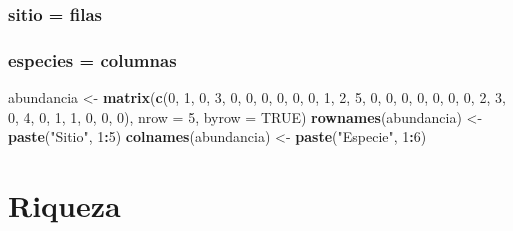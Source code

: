 \documentclass[
]{article}
\newenvironment{Shaded}{\begin{snugshade}}{\end{snugshade}}
\newcommand{\AttributeTok}[1]{\textcolor[rgb]{0.13,0.29,0.53}{#1}}
\newcommand{\ConstantTok}[1]{\textcolor[rgb]{0.56,0.35,0.01}{#1}}
\newcommand{\DecValTok}[1]{\textcolor[rgb]{0.00,0.00,0.81}{#1}}
\newcommand{\FunctionTok}[1]{\textcolor[rgb]{0.13,0.29,0.53}{\textbf{#1}}}
\newcommand{\NormalTok}[1]{#1}
\newcommand{\OtherTok}[1]{\textcolor[rgb]{0.56,0.35,0.01}{#1}}
\newcommand{\SpecialCharTok}[1]{\textcolor[rgb]{0.81,0.36,0.00}{\textbf{#1}}}
\newcommand{\StringTok}[1]{\textcolor[rgb]{0.31,0.60,0.02}{#1}}
\begin{document}
\hypertarget{sitio-filas}{%
\subsubsection{sitio = filas}\label{sitio-filas}}

\hypertarget{especies-columnas}{%
\subsubsection{especies = columnas}\label{especies-columnas}}

\begin{Shaded}
\begin{Highlighting}[]
\NormalTok{abundancia }\OtherTok{\textless{}{-}} \FunctionTok{matrix}\NormalTok{(}\FunctionTok{c}\NormalTok{(}\DecValTok{0}\NormalTok{, }\DecValTok{1}\NormalTok{, }\DecValTok{0}\NormalTok{, }\DecValTok{3}\NormalTok{, }\DecValTok{0}\NormalTok{, }\DecValTok{0}\NormalTok{,}
                       \DecValTok{0}\NormalTok{, }\DecValTok{0}\NormalTok{, }\DecValTok{0}\NormalTok{, }\DecValTok{0}\NormalTok{, }\DecValTok{1}\NormalTok{, }\DecValTok{2}\NormalTok{,}
                       \DecValTok{5}\NormalTok{, }\DecValTok{0}\NormalTok{, }\DecValTok{0}\NormalTok{, }\DecValTok{0}\NormalTok{, }\DecValTok{0}\NormalTok{, }\DecValTok{0}\NormalTok{,}
                       \DecValTok{0}\NormalTok{, }\DecValTok{0}\NormalTok{, }\DecValTok{2}\NormalTok{, }\DecValTok{3}\NormalTok{, }\DecValTok{0}\NormalTok{, }\DecValTok{4}\NormalTok{,}
                       \DecValTok{0}\NormalTok{, }\DecValTok{1}\NormalTok{, }\DecValTok{1}\NormalTok{, }\DecValTok{0}\NormalTok{, }\DecValTok{0}\NormalTok{, }\DecValTok{0}\NormalTok{), }
                     \AttributeTok{nrow =} \DecValTok{5}\NormalTok{, }\AttributeTok{byrow =} \ConstantTok{TRUE}\NormalTok{)}
\FunctionTok{rownames}\NormalTok{(abundancia) }\OtherTok{\textless{}{-}} \FunctionTok{paste}\NormalTok{(}\StringTok{"Sitio"}\NormalTok{, }\DecValTok{1}\SpecialCharTok{:}\DecValTok{5}\NormalTok{)}
\FunctionTok{colnames}\NormalTok{(abundancia) }\OtherTok{\textless{}{-}} \FunctionTok{paste}\NormalTok{(}\StringTok{"Especie"}\NormalTok{, }\DecValTok{1}\SpecialCharTok{:}\DecValTok{6}\NormalTok{)}
\end{Highlighting}
\end{Shaded}

\hypertarget{riqueza}{%
\section{Riqueza}\label{riqueza}}
\end{document}
